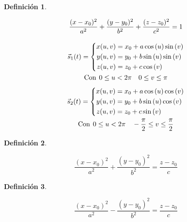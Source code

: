 \documentclass[a5paper,12pt,twoside]{book}
\newtheorem{defn}{{Definición}}[chapter]
\begin{document}
\begin{mdframed}[style=MyFrame1]
    \begin{defn}
    \end{defn}
    \begin{gather*}
        \frac{(x-x_0)^2}{a^2} + \frac{(y-y_0)^2}{b^2} + \frac{(z-z_0)^2}{c^2} = 1
        \\[1em]
        \Vec{s}_1(t) = \left\{
        \begin{aligned}
            x(u,v) &= x_0 + a \cos{(u)} \sin{(v)} \\
            y(u,v) &= y_0 + b \sin{(u)} \sin{(v)} \\
            z(u,v) &= z_0 + c \cos{(v)}
        \end{aligned}
        \right.
        \\
        \textrm{Con} \hspace{1ex} 0 \leq u < 2 \pi \quad 0 \leq v \leq \pi
        \\[1ex]
        \Vec{s}_2(t) = \left\{
        \begin{aligned}
            x(u,v) &= x_0 + a \cos{(u)} \cos{(v)} \\
            y(u,v) &= y_0 + b \sin{(u)} \cos{(v)} \\
            z(u,v) &= z_0 + c \sin{(v)}
        \end{aligned}
        \right.
        \\
        \textrm{Con} \hspace{1ex} 0 \leq u < 2 \pi \quad -\dfrac{\pi}{2} \leq v \leq \dfrac{\pi}{2}
    \end{gather*}
\end{mdframed}

\begin{mdframed}[style=MyFrame1]
    \begin{defn}
    \end{defn}
    \begin{equation*}
        \dfrac{(x-x_0)^2}{a^2} + \dfrac{(y-y_0)^2}{b^2} = \dfrac{z-z_0}{c}
    \end{equation*}
\end{mdframed}

\begin{mdframed}[style=MyFrame1]
    \begin{defn}
    \end{defn}
    \begin{equation*}
        \dfrac{(x-x_0)^2}{a^2} - \dfrac{(y-y_0)^2}{b^2} = \dfrac{z-z_0}{c}
    \end{equation*}
\end{mdframed}
\end{document}
